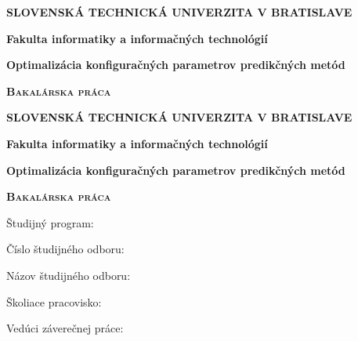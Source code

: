 \documentclass[12pt,oneside,slovak,a4paper]{book}
\begin{document}
\begin{titlepage}
	\centering
	{\large \textbf{SLOVENSKÁ TECHNICKÁ UNIVERZITA V BRATISLAVE} \par}
	\vspace{0.5cm}
	{\large \textbf{Fakulta informatiky a informačných technológií} \par}
	\vspace{6cm}
	{\huge\bfseries Optimalizácia konfiguračných parametrov predikčných metód \par}
	\vspace{2cm}
	{\scshape\large \textbf{Bakalárska práca} \par}
	\vspace{12.5cm}
	\vfill
\end{titlepage}

\begin{titlepage}
	\centering
	{\large \textbf{SLOVENSKÁ TECHNICKÁ UNIVERZITA V BRATISLAVE} \par}
	\vspace{0.5cm}
	{\large \textbf{Fakulta informatiky a informačných technológií} \par}
	\vspace{6cm}
	{\huge\bfseries Optimalizácia konfiguračných parametrov predikčných metód \par}
	\vspace{2cm}
	{\scshape\large \textbf{Bakalárska práca} \par}
	\vspace{5.5cm}
	\raggedright
	{\normalsize Študijný program: \par}
	{\normalsize Číslo študijného odboru: \par}
	{\normalsize Názov študijného odboru: \par}
	{\normalsize Školiace pracovisko: \par}
	{\normalsize Vedúci záverečnej práce: \par}
	\vspace{4.5cm}
\end{titlepage}



\tableofcontents
\end{document}

